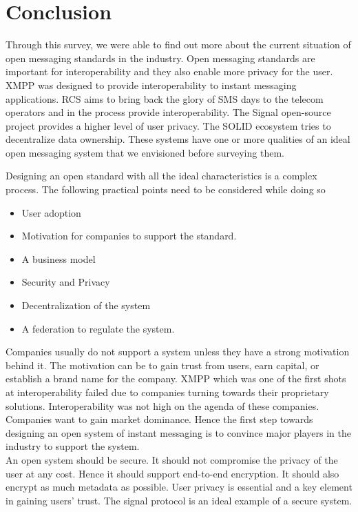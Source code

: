 \documentclass[11pt, conference, a4paper]{IEEEtran}
\begin{document}
\section{Conclusion}  
\label{SEC: conclusion}
Through this survey, we were able to find out more about the current situation of open messaging standards in the industry. Open messaging standards are important for interoperability and they also enable more privacy for the user.  XMPP was designed to provide interoperability to instant messaging applications. RCS aims to bring back the glory of SMS days to the telecom operators and in the process provide interoperability. The Signal open-source project provides a higher level of user privacy. The SOLID ecosystem tries to decentralize data ownership. These systems have one or more qualities of an ideal open messaging system that we envisioned before surveying them. 
\par
Designing an open standard with all the ideal characteristics is a complex process. The following practical points need to be considered while doing so
\begin{itemize}
\item User adoption
\item Motivation for companies to support the standard. 
\item A business model
\item Security and Privacy
\item Decentralization of the system
\item A federation to regulate the system. 
\end{itemize}
\par
Companies usually do not support a system unless they have a strong motivation behind it. The motivation can be to gain trust from users, earn capital, or establish a brand name for the company. XMPP which was one of the first shots at interoperability failed due to companies turning towards their proprietary solutions. Interoperability was not high on the agenda of these companies. Companies want to gain market dominance. Hence the first step towards designing an open system of instant messaging is to convince major players in the industry to support the system. \\
An open system should be secure. It should not compromise the privacy of the user at any cost. Hence it should support end-to-end encryption. It should also encrypt as much metadata as possible. User privacy is essential and a key element in gaining users’ trust. The signal protocol is an ideal example of a secure system.  
\end{document}
